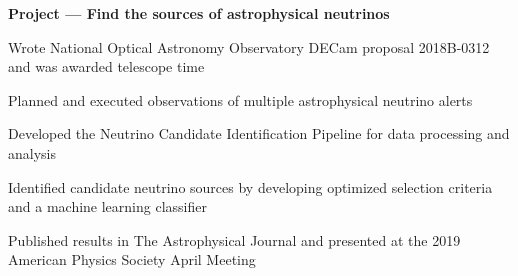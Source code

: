 
\begin{cventries}
\vspace{-0.3cm}
  \cventry
    {\textbf{Project --- Find the sources of astrophysical neutrinos}} %
    {} %
    {} %
    {} %
    {
    \begin{cvitems}
    \vspace{-0.1cm}
    \item{Wrote National Optical Astronomy Observatory DECam proposal 2018B-0312 and was awarded telescope time}
    \item{Planned and executed observations of multiple astrophysical neutrino alerts}
    \item{Developed the Neutrino Candidate Identification Pipeline for data processing and analysis}
    \item{Identified candidate neutrino sources by developing optimized selection criteria and a machine learning classifier}
    \item{Published results in The Astrophysical Journal and presented at the 2019 American Physics Society April Meeting}
    \end{cvitems}
    }

\end{cventries}
